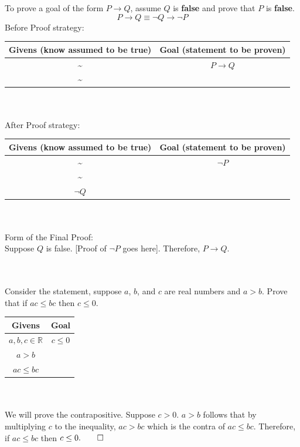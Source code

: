 \documentclass[../setup.tex]{subfiles}
\begin{document}
\begin{theorem}
	To prove a goal of the form $P \rightarrow Q$, assume $Q$ is \textbf{false} and prove that $P$ is \textbf{false}.
	\[P \rightarrow Q \equiv \lnot Q \rightarrow \lnot P\]
	Before Proof strategy:
	\begin{center}
	\begin{tabular}[t]{| c | c |}
		\hline
		Givens (know assumed to be true) & Goal (statement to be proven) \\
		\hline
		\textasciitilde & $P \rightarrow Q$ \\
		\textasciitilde & \\
		\hline
	\end{tabular}
	\end{center}
	\phantom \\ \\
	After Proof strategy:
	\begin{center}
	\begin{tabular}[t]{| c | c |}
		\hline
		Givens (know assumed to be true) & Goal (statement to be proven) \\
		\hline
		\textasciitilde & $\lnot P$ \\
		\textasciitilde & \\
		$\lnot Q$ & \\
		\hline
	\end{tabular}
	\end{center}
	\phantom \\ \\
	Form of the Final Proof: \\
	Suppose $Q$ is false. [Proof of $\lnot P$ goes here]. Therefore, $P \rightarrow Q$.
\end{theorem}
\phantom \\ \\
Consider the statement, suppose $a$, $b$, and $c$ are real numbers and $a > b$. Prove that if $ac \leq bc$ then $c \leq 0$. \\
\begin{center}
	\begin{tabular}[t]{| c | c |}
		\hline
		Givens  & Goal  \\
		\hline
		$a, b, c \in \mathbb{R}$ & $c \leq 0$\\
		$a > b$ & \\
		$ ac \leq bc$ & \\
		\hline
	\end{tabular}
\end{center}
\phantom \\ \\
We will prove the contrapositive. Suppose $c > 0$. $a > b$ follows that by multiplying $c$ to the inequality, $ac > bc$ which is the contra of $ac \leq bc$. Therefore, if $ac \leq bc$ then $c \leq 0. \qed$ \\
\end{document}
